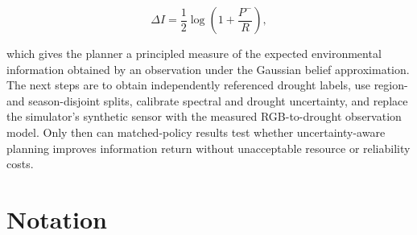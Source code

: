 \documentclass[11pt,a4paper]{article}
\begin{document}
\begin{equation}
\boxed{
\Delta I
=
\frac12
\log
\left(
1+\frac{P^-}{R}
\right),
}
\end{equation}

which gives the planner a principled measure of the expected
environmental information obtained by an observation under the
Gaussian belief approximation. The next steps are to obtain
independently referenced drought labels, use region- and
season-disjoint splits, calibrate spectral and drought uncertainty,
and replace the simulator's synthetic sensor with the measured
RGB-to-drought observation model. Only then can matched-policy results
test whether uncertainty-aware planning improves information return
without unacceptable resource or reliability costs.


\appendix

\section{Notation}
\end{document}
